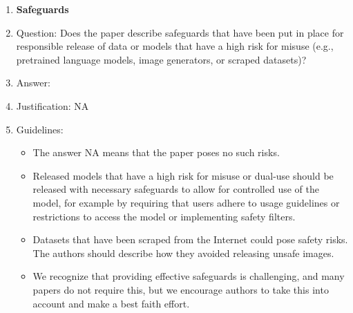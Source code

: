 \documentclass{article}
\begin{document}
\begin{enumerate}
\item {\bf Safeguards}
    \item[] Question: Does the paper describe safeguards that have been put in place for responsible release of data or models that have a high risk for misuse (e.g., pretrained language models, image generators, or scraped datasets)?
    \item[] Answer: \answerNA{} %
    \item[] Justification: NA
    \item[] Guidelines:
    \begin{itemize}
        \item The answer NA means that the paper poses no such risks.
        \item Released models that have a high risk for misuse or dual-use should be released with necessary safeguards to allow for controlled use of the model, for example by requiring that users adhere to usage guidelines or restrictions to access the model or implementing safety filters. 
        \item Datasets that have been scraped from the Internet could pose safety risks. The authors should describe how they avoided releasing unsafe images.
        \item We recognize that providing effective safeguards is challenging, and many papers do not require this, but we encourage authors to take this into account and make a best faith effort.
    \end{itemize}


\end{enumerate}
\end{document}
